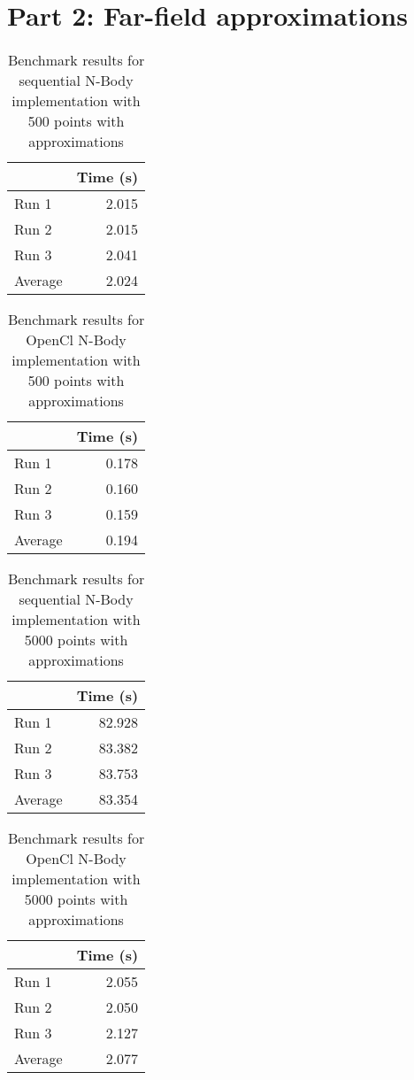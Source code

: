 \documentclass[12pt]{article}
\begin{document}
\section*{Part 2: Far-field approximations}

\begin{table}[H]
  \centering
  \begin{tabular}{lr}
    & {\bf Time (s)} \\
    \hline
    Run 1 & 2.015 \\
    Run 2 & 2.015 \\
    Run 3 & 2.041 \\
    \hline
    Average & 2.024
  \end{tabular}
  \caption{Benchmark results for sequential N-Body implementation with 500 points with approximations}
  \label{tbl-nbody-seq-500-approx}
\end{table}

\begin{table}[H]
  \centering
  \begin{tabular}{lr}
    & {\bf Time (s)} \\
    \hline
    Run 1 & 0.178 \\
    Run 2 & 0.160 \\
    Run 3 & 0.159 \\
    \hline
    Average & 0.194
  \end{tabular}
  \caption{Benchmark results for OpenCl N-Body implementation with 500 points with approximations}
  \label{tbl-nbody-gpu-500-approx}
\end{table}

\begin{table}[H]
  \centering
  \begin{tabular}{lr}
    & {\bf Time (s)} \\
    \hline
    Run 1 & 82.928 \\
    Run 2 & 83.382 \\
    Run 3 & 83.753 \\
    \hline
    Average & 83.354
  \end{tabular}
  \caption{Benchmark results for sequential N-Body implementation with 5000 points with approximations}
  \label{tbl-nbody-seq-5000-approx}
\end{table}

\begin{table}[H]
  \centering
  \begin{tabular}{lr}
    & {\bf Time (s)} \\
    \hline
    Run 1 & 2.055 \\
    Run 2 & 2.050 \\
    Run 3 & 2.127 \\
    \hline
    Average & 2.077
  \end{tabular}
  \caption{Benchmark results for OpenCl N-Body implementation with 5000 points with approximations}
  \label{tbl-nbody-gpu-5000-approx}
\end{table}
\end{document}
